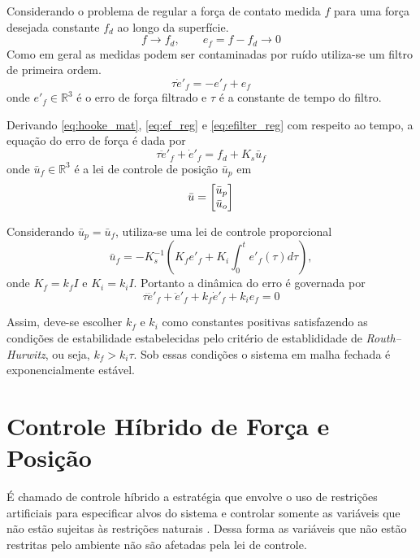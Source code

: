 Considerando o problema de regular a força de contato medida $f$ para uma força desejada constante $f_d$ ao longo da superfície. 
\begin{equation} \label{eq:ef_reg}
f \rightarrow f_d, \qquad e_f = f - f_d \to 0
\end{equation}
Como em geral as medidas podem ser contaminadas por ruído utiliza-se um filtro de primeira ordem.
\begin{equation} \label{eq:efilter_reg}
\tau \dot{e}'_{f} = -e'_{f} + e_f 
\end{equation}
onde $e'_{f} \in \mathbb{R}^3$ é o erro de força filtrado e $\tau$ é a constante de tempo do filtro. 

Derivando \eqref{eq:hooke_mat}, \eqref{eq:ef_reg} e \eqref{eq:efilter_reg} com respeito ao tempo, a equação do erro de força é dada por 
\begin{equation}
\tau \ddot{e}'_{f} + \dot{e}'_f = {f}_d + K_s \bar{u}_f
\end{equation}
onde $\bar{u}_f \in \mathbb{R}^3$ é a lei de controle de posição $\bar{u}_p$ em
\begin{equation}
\bar{u} = \begin{bmatrix} \bar{u}_p \\ \bar{u}_o \end{bmatrix}
\end{equation}

Considerando $\bar{u}_p = \bar{u}_f$, utiliza-se uma lei de controle proporcional
\begin{equation} \label{eq:pi_force}
\bar{{u}}_f = -{K}_s^{-1} ({K}_f {e'}_f + {K}_i \int_0^t {e'}_f (\tau)d\tau),
\end{equation}
onde $K_f = k_f I$ e $K_i = k_i I$. Portanto a dinâmica do erro é governada por 
\begin{equation}
\tau \dddot{e}'_f + \ddot{e}'_f + k_f \dot{e}'_f + k_i e_f = 0
\end{equation}

Assim, deve-se escolher $k_f$ e $k_i$ como constantes positivas satisfazendo as condições de estabilidade estabelecidas pelo critério de establididade de \textit{Routh–Hurwitz}, ou seja, $k_f > k_i \tau$. Sob essas condições o sistema em malha fechada é exponencialmente estável.


\section{Controle Híbrido de Força e Posição}

É chamado de controle híbrido a estratégia que envolve o uso de restrições artificiais para especificar alvos do sistema e controlar somente as variáveis que não estão sujeitas às restrições naturais \citep{xaud2016doris}. Dessa forma as variáveis que não estão restritas pelo ambiente não são afetadas pela lei de controle.


